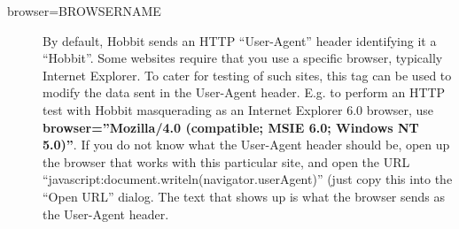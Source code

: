 \begin{description}
 

\item[browser=BROWSERNAME] By default, Hobbit sends an HTTP
  ``User-Agent'' header identifying it a ``Hobbit''. Some websites
  require that you use a specific browser, typically Internet
  Explorer. To cater for testing of such sites, this tag can be used
  to modify the data sent in the User-Agent header.   E.g. to perform
  an HTTP test with Hobbit masquerading as an Internet Explorer 6.0
  browser, use \textbf{browser=''Mozilla/4.0 (compatible; MSIE 6.0;
    Windows NT 5.0)''}. If you do not know what the User-Agent header
  should be, open up the browser that works with this particular site,
  and open the URL
  ``javascript:document.writeln(navigator.userAgent)'' (just copy this
  into the ``Open URL'' dialog. The text that shows up is what the
  browser sends as the User-Agent header. 


 


\end{description}

